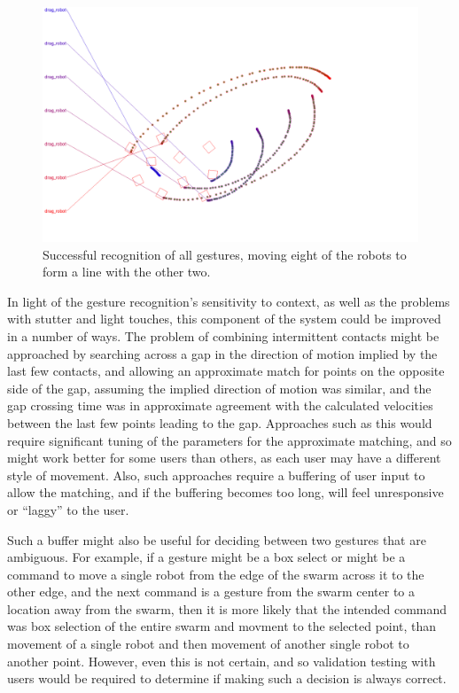  \begin{figure}
 	\centering
 	\includegraphics[width=\textwidth]{../../software/tool/test_pipeline/good_run/u8_c10_t10/u8_c10_t10_gestures.png}
 	\caption{Successful recognition of all gestures, moving eight of the robots to form a line with the other two. }
 	\label{recognizer_win}
 \end{figure}
 
In light of the gesture recognition's sensitivity to context, as well as the problems with stutter and light touches, this component of the system could be improved in a number of ways. 
The problem of combining intermittent contacts might be approached by searching across a gap in the direction of motion implied by the last few contacts, and allowing an approximate match for points on the opposite side of the gap, assuming the implied direction of motion was similar, and the gap crossing time was in approximate agreement with the calculated velocities between the last few points leading to the gap. 
Approaches such as this would require significant tuning of the parameters for the approximate matching, and so might work better for some users than others, as each user may have a different style of movement. 
Also, such approaches require a buffering of user input to allow the matching, and if the buffering becomes too long, will feel unresponsive or ``laggy'' to the user. 

Such a buffer might also be useful for deciding between two gestures that are ambiguous. 
For example, if a gesture might be a box select or might be a command to move a single robot from the edge of the swarm across it to the other edge, and the next command is a gesture from the swarm center to a location away from the swarm, then it is more likely that the intended command was box selection of the entire swarm and movment to the selected point, than movement of a single robot and then movement of another single robot to another point. 
However, even this is not certain, and so validation testing with users would be required to determine if making such a decision is always correct. 

